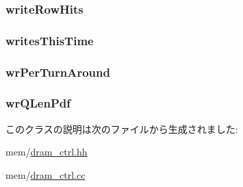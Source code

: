 \label{classDRAMCtrl_ae193ec834aceec0ed536dc53ec409f22}
\hypertarget{classDRAMCtrl_a5b75e7220ef0da8a50fe5777a9a1ae52}{
\subsubsection[{writeRowHits}]{ {\bf writeRowHits}}}
\label{classDRAMCtrl_a5b75e7220ef0da8a50fe5777a9a1ae52}
\hypertarget{classDRAMCtrl_a332d2848d0e28912ff8b0c8c9e09842a}{
\subsubsection[{writesThisTime}]{ {\bf writesThisTime}}}
\label{classDRAMCtrl_a332d2848d0e28912ff8b0c8c9e09842a}
\hypertarget{classDRAMCtrl_a6f8f6528076f5f3f9d56b7658368a781}{
\subsubsection[{wrPerTurnAround}]{ {\bf wrPerTurnAround}}}
\label{classDRAMCtrl_a6f8f6528076f5f3f9d56b7658368a781}
\hypertarget{classDRAMCtrl_ace3009d78850dc82f90724de8df96227}{
\subsubsection[{wrQLenPdf}]{ {\bf wrQLenPdf}}}
\label{classDRAMCtrl_ace3009d78850dc82f90724de8df96227}


このクラスの説明は次のファイルから生成されました:\begin{DoxyCompactItemize}
\item 
mem/\hyperlink{dram__ctrl_8hh}{dram\_\-ctrl.hh}\item 
mem/\hyperlink{dram__ctrl_8cc}{dram\_\-ctrl.cc}\end{DoxyCompactItemize}
